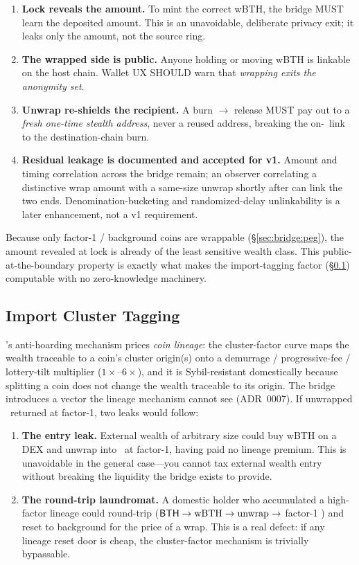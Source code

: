 \begin{enumerate}
  \item \textbf{Lock reveals the amount.} To mint the correct wBTH, the bridge
    MUST learn the deposited amount. This is an unavoidable, deliberate privacy
    exit; it leaks only the amount, not the source ring.
  \item \textbf{The wrapped side is public.} Anyone holding or moving wBTH is
    linkable on the host chain. Wallet UX SHOULD warn that \emph{wrapping exits
    the anonymity set}.
  \item \textbf{Unwrap re-shields the recipient.} A burn $\to$ release MUST pay
    out to a \emph{fresh one-time stealth address}, never a reused address,
    breaking the on-\Botho\ link to the destination-chain burn.
  \item \textbf{Residual leakage is documented and accepted for v1.} Amount and
    timing correlation across the bridge remain; an observer correlating a
    distinctive wrap amount with a same-size unwrap shortly after can link the
    two ends. Denomination-bucketing and randomized-delay unlinkability is a
    later enhancement, not a v1 requirement.
\end{enumerate}

Because only factor-1 / background coins are wrappable
(\S\ref{sec:bridge:peg}), the amount revealed at lock is already of the least
sensitive wealth class. This public-at-the-boundary property is exactly what
makes the import-tagging factor (\S\ref{sec:bridge:import}) computable with no
zero-knowledge machinery.

\subsection{Import Cluster Tagging}
\label{sec:bridge:import}

\Botho's anti-hoarding mechanism prices \emph{coin lineage}: the cluster-factor
curve maps the wealth traceable to a coin's cluster origin(s) onto a
demurrage / progressive-fee / lottery-tilt multiplier ($1\times$--$6\times$),
and it is Sybil-resistant domestically because splitting a coin does not change
the wealth traceable to its origin. The bridge introduces a vector the lineage
mechanism cannot see (ADR~0007). If unwrapped \BTH\ returned at factor-1, two
leaks would follow:

\begin{enumerate}
  \item \textbf{The entry leak.} External wealth of arbitrary size could buy
    wBTH on a DEX and unwrap into \Botho\ at factor-1, having paid no lineage
    premium. This is unavoidable in the general case---you cannot tax external
    wealth entry without breaking the liquidity the bridge exists to provide.
  \item \textbf{The round-trip laundromat.} A domestic holder who accumulated a
    high-factor lineage could round-trip
    ($\textsf{BTH} \to \text{wBTH} \to \text{unwrap} \to$ factor-1 \BTH) and reset to
    background for the price of a wrap. This is a real defect: if any lineage
    reset door is cheap, the cluster-factor mechanism is trivially bypassable.
\end{enumerate}

